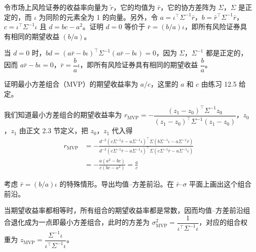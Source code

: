 \begin{problem}
 令市场上风险证券的收益率向量为 $\tilde{r}$，它的均值为 $\bar{r}$，它的协方差阵为 $\Sigma$，$\Sigma$ 是正定的，而 $\iota$ 为同阶的元素全为 1 的向量。另外，令 $a=\iota^{\top}\Sigma^{-1}\bar{r}$，$b=\bar{r}^{\top}\Sigma^{-1}\bar{r}$，$c=\iota^{\top}\Sigma^{-1}\iota$ 且 $d=bc-a^{2}$。证明 $d=0$ 等价于 $\bar{r}=(b/a)\iota$，即所有风险证券具有相同的期望收益 $(b/a)$。
\end{problem}
\begin{solution}
当 $d=0$ 时，$bd=(a\bar{r}-b\iota)^{\top}\Sigma^{-1}(a\bar{r}-b\iota)=0$，因为 $\Sigma$，$\Sigma^{-1}$ 都是正定的，因而 $a\bar{r}-b\iota=0$，$\bar{r}=\dfrac{b}{a}\iota$，即所有风险证券具有相同的期望收益 $\dfrac{b}{a}$。
\end{solution}

\begin{problem}
 证明最小方差组合（MVP）的期望收益率为 $a/c$，这里的 $a$ 和 $c$ 由练习 12.5 给定。
\end{problem}
\begin{solution}
我们知道最小方差组合的期望收益率为 $r_{\mathrm{MVP}}=-\dfrac{(z_{1}-z_{0})^{\top}\Sigma^{-1}z_{0}}{(z_{1}-z_{0})^{\top}\Sigma^{-1}(z_{1}-z_{0})}$，$z_{0}$，$z_{1}$ 由正文 2.3 节定义，把 $z_{0}$，$z_{1}$ 代入得
\[
    \begin{aligned}
        r_{\mathrm{MVP}}
        &=-\frac{d^{-2}(c\Sigma^{-1}\bar{r}-a\Sigma^{-1}\iota)^{\top}\Sigma(b\Sigma^{-1}\iota-a\Sigma^{-1}\bar{r})}{d^{-2}(c\Sigma^{-1}\bar{r}-a\Sigma^{-1}\iota)^{\top}\Sigma(c\Sigma^{-1}\bar{r}-a\Sigma^{-1}\iota)}\\
        &=-\frac{a(a^{2}-bc)}{c(bc-a^{2})}=\frac{a}{c}
    \end{aligned}
\]
\end{solution}

\begin{problem}
 考虑 $\bar{r}=(b/a)\iota$ 的特殊情形。导出均值--方差前沿。在 $\bar{r}$--$\sigma$ 平面上画出这个组合前沿。
\end{problem}
\begin{solution}
当期望收益率都相等时，所有组合的期望收益率都是常数，因而均值--方差前沿组合退化成为一点即最小方差组合，此时的方差为 $\sigma_{\mathrm{MVP}}^{2}=\dfrac{1}{\iota^{\top}\Sigma^{-1}\iota}$，对应的组合权重为 $z_{\mathrm{MVP}}=\dfrac{\Sigma^{-1}\iota}{\iota^{\top}\Sigma^{-1}\iota}$。
\end{solution}

